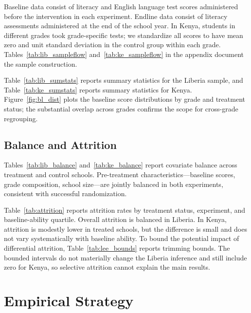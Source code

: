 \documentclass[11pt]{article}
\begin{document}
Baseline data consist of literacy and English language test scores administered before the intervention in each experiment. Endline data consist of literacy assessments administered at the end of the school year. In Kenya, students in different grades took grade-specific tests; we standardize all scores to have mean zero and unit standard deviation in the control group within each grade. Tables~\ref{tab:lib_sampleflow} and~\ref{tab:ke_sampleflow} in the appendix document the sample construction.

Table~\ref{tab:lib_sumstats} reports summary statistics for the Liberia sample, and Table~\ref{tab:ke_sumstats} reports summary statistics for Kenya. Figure~\ref{fig:bl_dist} plots the baseline score distributions by grade and treatment status; the substantial overlap across grades confirms the scope for cross-grade regrouping.

\subsection{Balance and Attrition}

Tables~\ref{tab:lib_balance} and~\ref{tab:ke_balance} report covariate balance across treatment and control schools. Pre-treatment characteristics---baseline scores, grade composition, school size---are jointly balanced in both experiments, consistent with successful randomization.

Table~\ref{tab:attrition} reports attrition rates by treatment status, experiment, and baseline-ability quartile. Overall attrition is balanced in Liberia. In Kenya, attrition is modestly lower in treated schools, but the difference is small and does not vary systematically with baseline ability. To bound the potential impact of differential attrition, Table~\ref{tab:lee_bounds} reports \citet{lee2009training} trimming bounds. The bounded intervals do not materially change the Liberia inference and still include zero for Kenya, so selective attrition cannot explain the main results.


\section{Empirical Strategy}
\label{sec:strategy}
\end{document}
